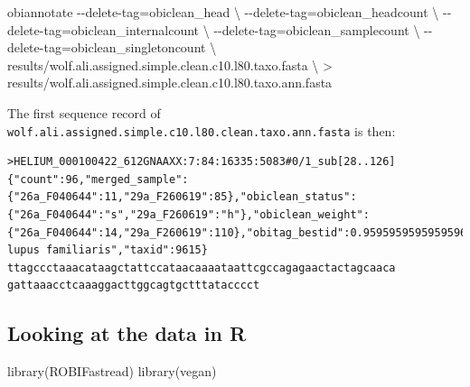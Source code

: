 \documentclass[
  letterpaper,
  DIV=11,
  numbers=noendperiod]{scrreprt}
\newenvironment{Shaded}{\begin{snugshade}}{\end{snugshade}}
\newcommand{\AttributeTok}[1]{\textcolor[rgb]{0.40,0.45,0.13}{#1}}
\newcommand{\DataTypeTok}[1]{\textcolor[rgb]{0.68,0.00,0.00}{#1}}
\newcommand{\ExtensionTok}[1]{\textcolor[rgb]{0.00,0.23,0.31}{#1}}
\newcommand{\FunctionTok}[1]{\textcolor[rgb]{0.28,0.35,0.67}{#1}}
\newcommand{\NormalTok}[1]{\textcolor[rgb]{0.00,0.23,0.31}{#1}}
\newcommand{\OperatorTok}[1]{\textcolor[rgb]{0.37,0.37,0.37}{#1}}
\begin{document}
\begin{Shaded}
\begin{Highlighting}[]
\ExtensionTok{obiannotate}  \AttributeTok{{-}{-}delete{-}tag}\OperatorTok{=}\NormalTok{obiclean\_head }\DataTypeTok{\textbackslash{}}
             \AttributeTok{{-}{-}delete{-}tag}\OperatorTok{=}\NormalTok{obiclean\_headcount }\DataTypeTok{\textbackslash{}}
             \AttributeTok{{-}{-}delete{-}tag}\OperatorTok{=}\NormalTok{obiclean\_internalcount }\DataTypeTok{\textbackslash{}}
             \AttributeTok{{-}{-}delete{-}tag}\OperatorTok{=}\NormalTok{obiclean\_samplecount }\DataTypeTok{\textbackslash{}}
             \AttributeTok{{-}{-}delete{-}tag}\OperatorTok{=}\NormalTok{obiclean\_singletoncount }\DataTypeTok{\textbackslash{}}
\NormalTok{  results/wolf.ali.assigned.simple.clean.c10.l80.taxo.fasta }\DataTypeTok{\textbackslash{}}
  \OperatorTok{\textgreater{}}\NormalTok{ results/wolf.ali.assigned.simple.clean.c10.l80.taxo.ann.fasta}
\end{Highlighting}
\end{Shaded}

The first sequence record of
\texttt{wolf.ali.assigned.simple.c10.l80.clean.taxo.ann.fasta} is then:

\begin{verbatim}
>HELIUM_000100422_612GNAAXX:7:84:16335:5083#0/1_sub[28..126] {"count":96,"merged_sample":{"26a_F040644":11,"29a_F260619":85},"obiclean_status":{"26a_F040644":"s","29a_F260619":"h"},"obiclean_weight":{"26a_F040644":14,"29a_F260619":110},"obitag_bestid":0.9595959595959596,"obitag_bestmatch":"AC187326","obitag_difference":4,"obitag_match_count":1,"obitag_rank":"subspecies","scientific_name":"Canis lupus familiaris","taxid":9615}
ttagccctaaacataagctattccataacaaaataattcgccagagaactactagcaaca
gattaaacctcaaaggacttggcagtgctttatacccct
\end{verbatim}

\hypertarget{looking-at-the-data-in-r}{%
\subsection{Looking at the data in R}\label{looking-at-the-data-in-r}}

\begin{Shaded}
\begin{Highlighting}[]
\FunctionTok{library}\NormalTok{(ROBIFastread)}
\FunctionTok{library}\NormalTok{(vegan)}
\end{Highlighting}
\end{Shaded}
\end{document}
